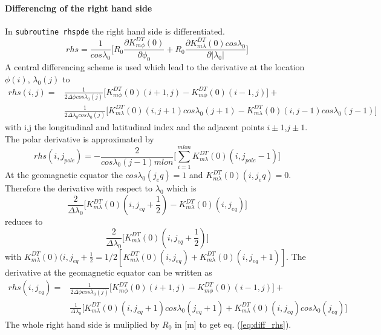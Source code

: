 \paragraph{Differencing of the right hand side}
%
In \texttt{subroutine rhspde} the right hand side is differentiated. 
%
\begin{equation}
   rhs = \frac{1}{cos \lambda_0} \bigl[ R_0 \frac{\partial K_{m \phi}^{DT}(0)}{\partial \phi_0} +  
   R_0 \frac{\partial K_{m \lambda }^{DT}(0) cos \lambda_0}{\partial | \lambda_0 |}
   \bigr] \label{eq:diff_rhs}
\end{equation}
%
A central differencing scheme is used which lead to the derivative at the location 
$\phi(i)$, $\lambda_0(j)$ to
%
\begin{equation}
\begin{split}
  rhs(i,j) = & \frac{1}{ 2 \Delta \phi cos \lambda_0(j)} \bigl[ K_{m \phi}^{DT}(0)(i+1,j) - 
      K_{m \phi}^{DT}(0)(i-1,j)\bigr] + \\
   & \frac{1}{ 2 \Delta \lambda_0 cos \lambda_0(j)} \bigl[ K_{m \lambda }^{DT}(0)(i,j+1) 
    cos \lambda_0(j+1)- K_{m \lambda }^{DT}(0)(i,j-1)cos \lambda_0(j-1) \bigr] 
\end{split}
\end{equation}
%
with i,j the longitudinal and latitudinal index and the adjacent points $i\pm 1$,$j \pm1$.
The polar derivative is approximated by
%
\begin{equation}
   rhs (i,j_{pole}) = - \frac{2}{cos \lambda_0(j-1) mlon} \bigl[ \sum_{i=1}^{mlon} 
       K_{m \lambda }^{DT}(0)(i,j_{pole} - 1)  \bigr]
\end{equation}
%
At the geomagnetic equator the $cos \lambda_0(j_eq)=1$ and $K_{m \lambda }^{DT}(0)(i,j_eq) =0$.
Therefore the derivative with respect to $\lambda_0$ which is
%
\begin{equation}
  \frac{2}{ \Delta \lambda_0} \bigl[ K_{m \lambda }^{DT}(0)(i,j_{eq}+
       \frac{1}{2}) - K_{m \lambda }^{DT}(0)(i,j_{eq}) \bigr]
\end{equation}
%
reduces to 
%
\begin{equation}
  \frac{2}{ \Delta \lambda_0} \bigl[ K_{m \lambda }^{DT}(0)(i,j_{eq}+
       \frac{1}{2})  \bigr]
\end{equation}
%
with $ K_{m \lambda }^{DT}(0)(i,j_{eq}+ \frac{1}{2} =  1/2 [K_{m \lambda }^{DT}(0)(i,j_{eq}) +
K_{m \lambda }^{DT}(0)(i,j_{eq}+ 1)] $. The derivative at the geomagnetic equator can be written
as 
%
\begin{equation}
\begin{split}
  rhs(i,j_{eq}) =& \frac{1}{ 2 \Delta \phi cos \lambda_0(j)} \bigl[ K_{m \phi}^{DT}(0)(i+1,j) - 
      K_{m \phi}^{DT}(0)(i-1,j)\bigr] + \\
     &\frac{1}{ \Delta \lambda_0 } \bigl[ K_{m \lambda }^{DT}(0)(i,j_{eq}+1) 
    cos \lambda_0(j_{eq}+1)+ K_{m \lambda }^{DT}(0)(i,j_{eq})cos \lambda_0(j_{eq}) \bigr]  
\end{split}
\end{equation}
%
The whole right hand side is muliplied by $R_0$ in [m] to get eq. (\ref{eq:diff_rhs}). 
%

